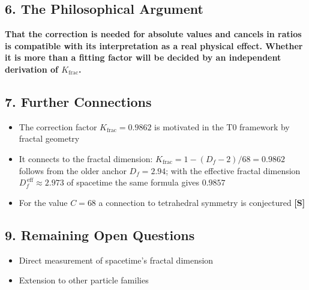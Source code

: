	\subsection*{6. The Philosophical Argument}
	
	\begin{tcolorbox}[colback=blue!5!white,colframe=blue!75!black]
		\textbf{That the correction is needed for absolute values and cancels in ratios is compatible with its interpretation as a real physical effect. Whether it is more than a fitting factor will be decided by an independent derivation of $K_{\text{frac}}$.}
	\end{tcolorbox}
	
	\subsection*{7. Further Connections}
	
	\begin{itemize}
		\item The correction factor $K_{\text{frac}} = 0.9862$ is motivated in the T0 framework by fractal geometry
		\item It connects to the fractal dimension: $K_{\text{frac}} = 1-(D_f-2)/68 = 0.9862$ follows from the older anchor $D_f = 2.94$; with the effective fractal dimension $D_f^{\,\text{eff}} \approx 2.973$ of spacetime the same formula gives $0.9857$
		\item For the value $C = 68$ a connection to tetrahedral symmetry is conjectured \textbf{[S]}
	\end{itemize}
	
	\subsection*{9. Remaining Open Questions}
	
	\begin{itemize}
		\item Direct measurement of spacetime's fractal dimension

		\item Extension to other particle families
	\end{itemize}
